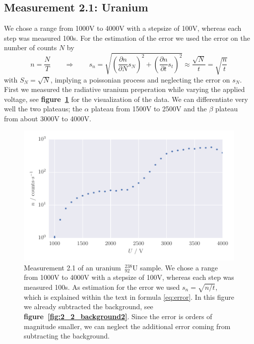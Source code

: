 \label{sec:measurements} 
\subsection{Measurement 2.1: Uranium}
\label{subsec:uranium}
We chose a range from 1000V to 4000V with a stepsize of 100V, whereas each step was measured 100s. 
For the estimation of the error we used the error on the number of counts $N$ by
\begin{equation}
n = \frac{N}{T} \qquad \Rightarrow \qquad s_n =\sqrt{\left ( \frac{\partial n}{\partial N} s_N \right )^2 + \left (\frac{\partial n}{\partial t}s_t \right)^2 }
\approx \frac{\sqrt{N}}{t} = \sqrt{\frac{n}{t}}
\label{eq:error}
\end{equation}
with $S_N=\sqrt{N}$, implying a poissonian process and neglecting the error on $s_N$.
First we measured the radiative uranium preperation while varying the 
applied voltage, see \textbf{figure~\ref{fig:2_1_uranium}} for the visualization 
of the data. We can differentiate very well the two plateaus;
the $\alpha$ plateau from 1500V to 2500V and the  $\beta$ plateau from about 3000V to 4000V.
\begin{figure}[H]
    \centering
    \includegraphics[width=\linewidth]{analysis/figures/2_1_uranium}
    \caption{Measurement 2.1 of an uranium $\mathrm{~^{238}_{92}U}$ sample. We chose a range from 1000V to 4000V
    with a stepsize of 100V, whereas each step was measured 100s. As estimation for the
    error we used $s_n=\sqrt{n / t}$, which is explained within the text in formula \eqref{eq:error}. In this figure 
    we already subtracted the background, see \textbf{figure~\ref{fig:2_2_background2}}. Since 
    the error is orders of magnitude smaller, we can neglect the additional error coming from subtracting the background. }
    \label{fig:2_1_uranium}
\end{figure}
